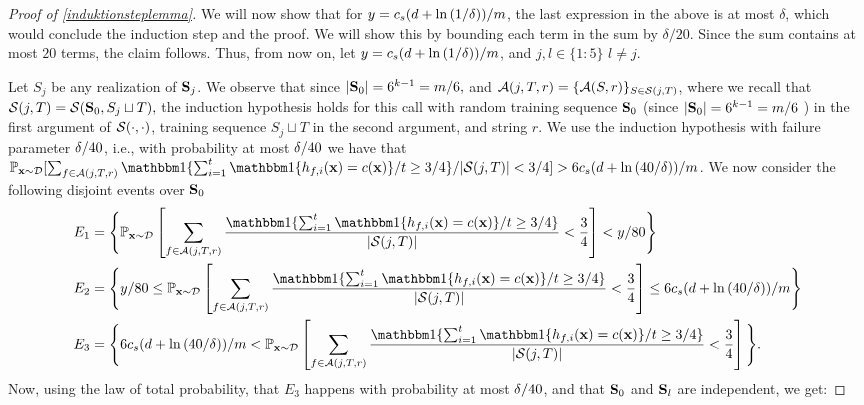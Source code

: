\begin{proof}[Proof of \cref{induktionsteplemma}]
We will now show that for $y=c_s(d+\ln{\left(1/\delta \right)})/m$, the last expression in the above is at most $\delta$, which would conclude the induction step and the proof. We will show this by bounding each term in the sum by $ \delta/20 $. Since the sum contains at most $ 20 $ terms, the claim follows. Thus, from now on, let $y=c_s(d+\ln{\left(1/\delta \right)})/m$, and $ j,l\in\{ 1:5 \} $ $ l\not=j $. 


Let $S_{j}$ be any realization of $\mathbf{S}_{j}$. We observe that since $|\mathbf{S}_{0}|=6^{k-1}=m/6,$ and $\mathcal{A}(j,T,r)=\{\mathcal{A}(S,r)\}_{S\in\mathcal{S}(j,T)}$, where we recall that $\mathcal{S}(j,T)=\mathcal{S}(\mathbf{S}_{0},S_{j}\sqcup T),$ the induction hypothesis holds for this call with random training sequence $\mathbf{S}_0$ (since $ |\mathbf{S}_{0}|=6^{k-1}=m/6 $ ) in the first argument of $\mathcal{S}(\cdot,\cdot)$,  training sequence $S_{j}\sqcup T$ in the second argument, and string $r$. We use the induction hypothesis with failure parameter $\delta/40$, i.e., with probability at most $\delta/40$ we have that  $\p_{\rx\sim \cD}[\sum_{f\in \cA(j,T,r)} \ind\{\sum_{i=1}^{t} \ind\{h_{f,i}(\rx)=c(\rx)\}/t\geq 3/4\}/|\cS(j,T)|
<3/4]> 6\cs(d+\ln{(\cnn/\delta )})/m$. We now consider the following disjoint events over $ \mathbf{S}_{0} $ 
\begin{align*}
 &E_1
  = 
 \Bigg\{  \p_{\rx\sim \cD} \left[\sum_{f\in \cA(j,T,r)} \frac{\ind\{\sum_{i=1}^{t} \ind\{h_{f,i}(\rx)=c(\rx)\}/t\geq 3/4\}}{|\cS(j,T)|}
  < \frac{3}{4} \right]< y/80\Bigg\} 
\\
&E_{2}
 = 
\Bigg\{  y/80
\leq
\p_{\rx\sim \cD}  \left[ \sum_{f\in \cA(j,T,r)}      \frac{\ind\{\sum_{i=1}^{t} \ind\{h_{f,i}(\rx)=c(\rx)\}/t\geq 3/4\}}{|\cS(j,T)|}
 < \frac{3}{4} \right]  \leq  6\cs(d+\ln{\left(\cnn/\delta \right)})/m \Bigg\} 
\\
&E_{3} = \Bigg\{6\cs(d+\ln{\left(\cnn/\delta \right)})/m< \p_{\rx\sim \cD}  \left[\sum_{f\in \cA(j,T,r)} \frac{\ind\{\sum_{i=1}^{t} \ind\{h_{f,i}(\rx)=c(\rx)\}/t\geq 3/4\}}{|\cS(j,T)|}
 < \frac{3}{4} \right] \Bigg\} .
\end{align*} 
Now, using the law of total probability, that $E_{3}$ happens with probability at most $\delta/40$, and that $ \mathbf{S}_{0} $ and $ \mathbf{S}_{l} $ are independent, we get:



\end{proof}
